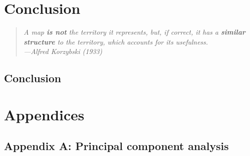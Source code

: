 \documentclass[12pt, TexShade, letterpaper]{report}
\begin{document}
%
%

\part{Conclusion}
\label{part:conclusion}

\pagebreak
\hspace{0pt}
\vfill

\begin{center}
\begin{quote} 
\begin{singlespace}
\textit{A map \textbf{is not} the territory it represents, but, if correct, it has a \textbf{similar structure} to the territory, which accounts for its usefulness.\\
---Alfred Korzybski (1933)}
\end{singlespace}
\end{quote}
\end{center}

\vfill
\hspace{0pt}
\pagebreak

\chapter*{Conclusion}
\label{chap:conclusion}



%

\newpage

%
%



%
%
%


%


%
%

\appendix

\part{Appendices}
\chapter*{Appendix A: Principal component analysis}
\label{appendix:AppendixA}

\end{document}
